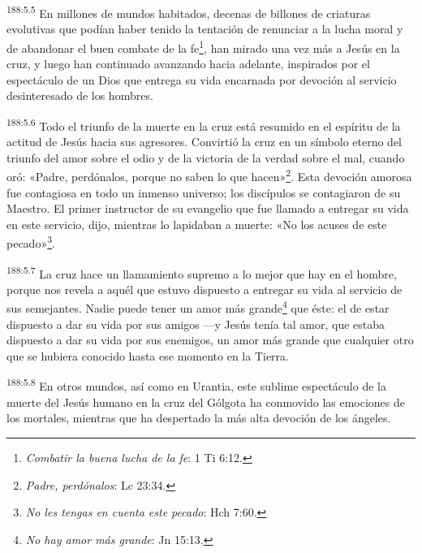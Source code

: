 \par 
\textsuperscript{188:5.5} En millones de mundos habitados, decenas de billones de criaturas evolutivas que podían haber tenido la tentación de renunciar a la lucha moral y de abandonar el buen combate de la fe\footnote{\textit{Combatir la buena lucha de la fe}: 1 Ti 6:12.}, han mirado una vez más a Jesús en la cruz, y luego han continuado avanzando hacia adelante, inspirados por el espectáculo de un Dios que entrega su vida encarnada por devoción al servicio desinteresado de los hombres.

\par 
\textsuperscript{188:5.6} Todo el triunfo de la muerte en la cruz está resumido en el espíritu de la actitud de Jesús hacia sus agresores. Convirtió la cruz en un símbolo eterno del triunfo del amor sobre el odio y de la victoria de la verdad sobre el mal, cuando oró: «Padre, perdónalos, porque no saben lo que hacen»\footnote{\textit{Padre, perdónalos}: Lc 23:34.}. Esta devoción amorosa fue contagiosa en todo un inmenso universo; los discípulos se contagiaron de su Maestro. El primer instructor de su evangelio que fue llamado a entregar su vida en este servicio, dijo, mientras lo lapidaban a muerte: «No los acuses de este pecado»\footnote{\textit{No les tengas en cuenta este pecado}: Hch 7:60.}.

\par 
\textsuperscript{188:5.7} La cruz hace un llamamiento supremo a lo mejor que hay en el hombre, porque nos revela a aquél que estuvo dispuesto a entregar su vida al servicio de sus semejantes. Nadie puede tener un amor más grande\footnote{\textit{No hay amor más grande}: Jn 15:13.} que éste: el de estar dispuesto a dar su vida por sus amigos ---y Jesús tenía tal amor, que estaba dispuesto a dar su vida por sus enemigos, un amor más grande que cualquier otro que se hubiera conocido hasta ese momento en la Tierra.

\par 
\textsuperscript{188:5.8} En otros mundos, así como en Urantia, este sublime espectáculo de la muerte del Jesús humano en la cruz del Gólgota ha conmovido las emociones de los mortales, mientras que ha despertado la más alta devoción de los ángeles.


